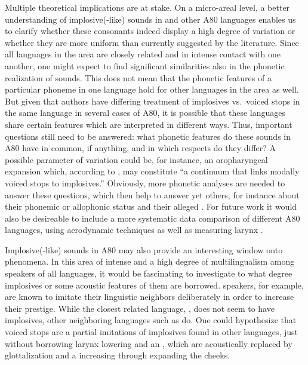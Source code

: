 \documentclass[output=paper]{LSP/langsci}
\begin{document}
Multiple theoretical implications are at stake.  On a micro-areal level, a better understanding of implosive(-like) sounds in  and other A80 languages enables us to clarify whether these consonants indeed display a high degree of variation or whether they are more uniform than currently suggested by the literature. Since all languages in the area are closely related and in intense contact with one another, one might expect to find significant similarities also in the phonetic realization of sounds.  This does not mean that the phonetic features of a particular phoneme in one language hold for other languages in the area as well. But given that authors have differing treatment of implosives vs.\ voiced stops in the same language in several cases of A80, it is possible that  these languages share certain features which are interpreted in different ways. Thus, important questions still need to be answered:  what phonetic features do these sounds in A80 have in common, if anything, and  in which respects do they differ? A possible parameter of variation could be, for instance, an oropharyngeal expansion which, according to \citet[55]{Ladefoged1996}, may constitute ``a continuum that links modally voiced stops to implosives.'' Obviously, more phonetic analyses are needed to answer these questions, which then help to answer yet others, for instance about their phonemic or allophonic status and their alleged . For future work it would also be desireable to include a more systematic data comparison of different A80 languages, using aerodynamic techniques as well as measuring larynx .

Implosive(-like) sounds in A80 may also provide an interesting window onto  phenomena. In this area of intense  and a high degree of multilingualism among speakers of all languages, it would be fascinating to investigate to what degree implosives or some acoustic features of them are borrowed.  speakers, for example, are known to imitate their linguistic  neighbors deliberately in order to increase their prestige. While the closest related language, , does not seem to have implosives, other neighboring languages such as  do. One could hypothesize that  voiced stops are a partial imitations of implosives found in other languages, just without borrowing larynx lowering and an , which are acoustically replaced by glottalization and a  increasing through expanding the cheeks.
\end{document}
